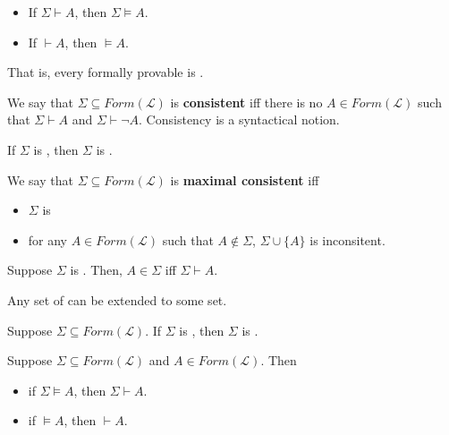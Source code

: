 \documentclass[english, 11pt]{article}
\begin{document}
  \begin{thrm}[soundness]
    \begin{itemize}
      \item If $\Sigma \vdash A$, then $\Sigma \models A$.
      \item If $\vdash A$, then $\models A$.
    \end{itemize}
    That is, every formally provable  is .
  \end{thrm}

  \begin{defn}[consistent]\label{consistent}
  We say that $\Sigma \subseteq Form(\mathcal{L})$ is \textbf{consistent} iff there is no $A \in Form(\mathcal{L})$ such that $\Sigma \vdash A$ and $\Sigma \vdash \neg A$. Consistency is a syntactical notion.
  \end{defn}

  \begin{thrm}
    If $\Sigma$ is , then $\Sigma$ is .
  \end{thrm}

  \begin{defn}\label{maximal consistent}
  We say that $\Sigma \subseteq Form(\mathcal{L})$ is \textbf{maximal consistent} iff
  \begin{itemize}
    \item $\Sigma$ is 
    \item for any $A \in Form(\mathcal{L})$ such that $A \not \in \Sigma$, $\Sigma \cup \{ A\}$ is inconsitent.
  \end{itemize}
  \begin{lem}
    Suppose $\Sigma$ is . Then, $A \in \Sigma$ iff $\Sigma \vdash A$.
  \end{lem}
  \begin{lem}\label{Lindenbaum Lemma}
    Any  set of  can be extended to some  set.
  \end{lem}
  \begin{thrm}
    Suppose $\Sigma \subseteq Form(\mathcal{L})$. If $\Sigma$ is , then $\Sigma$ is .
  \end{thrm}
  \begin{thrm}
    Suppose $\Sigma \subseteq Form(\mathcal{L})$ and $A \in Form(\mathcal{L})$. Then
    \begin{itemize}
      \item if $\Sigma \models A$, then $\Sigma \vdash A$.
      \item if $\models A$, then $\vdash A$.
    \end{itemize}
  \end{thrm}
  \end{defn}
\end{document}

